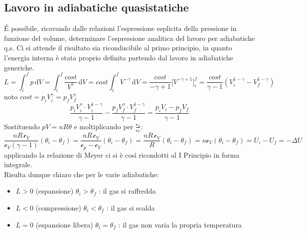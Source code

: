 \documentclass[10pt, oneside]{book}
\newcommand{\ds}{\displaystyle}
\newcommand{\integral}[4]{\int_{#1}^{#2} #3 \, \mathrm{d}#4}
\newcommand{\molhtv}{\mathcal{c}_V }
\newcommand{\molhtp}{\mathcal{c}_p }
\begin{document}
\subsection{Lavoro in adiabatiche quasistatiche}
\'E possibile, ricavando dalle relazioni l'espressione esplicita della pressione in funzione del volume, determinare l'espressione analitica del lavoro per adiabatiche q.s. Ci si attende il risultato sia riconducibile al primo principio, in quanto l'energia interna è stata proprio definita partendo dal lavoro in adiabatiche generiche.
\[L = \integral{i}{f}{p}{V} = \integral{i}{f}{\frac{cost}{V^\gamma}}{V} = cost \integral{i}{f}{V^{-\gamma}}{V} = \frac{cost}{- \gamma + 1} \big[V^{-\gamma + 1}\big]_i^f = \frac{cost}{\gamma - 1}(V_i^{1-\gamma} - V_f^{1-\gamma})\]
noto $\ds cost = p_iV_i^\gamma = p_f V_f^\gamma$
\[\frac{p_i V_i^\gamma \cdot V_i^{1-\gamma}}{\gamma - 1} - \frac{p_f V_f^\gamma \cdot V_f^{1-\gamma}}{\gamma - 1} = \boxed{\frac{p_iV_i - p_f V_f}{\gamma -1}}\]
Sostituendo $pV = nR\theta$ e moltiplicando per $\ds \frac{\molhtv}{\molhtv}$:
\[\frac{nR \, \molhtv}{\molhtv(\gamma -1)} (\theta_i - \theta_f) = \frac{nR \,  \molhtv}{\molhtp - \molhtv}(\theta_i - \theta_f) = \frac{nR \,  \molhtv}{R}(\theta_i - \theta_f) = n \molhtv (\theta_i - \theta_f) = U_i - U_f = - \Delta U\]
applicando la relazione di Meyer ci si è così ricondotti al I Principio in forma integrale.\\
Risulta dunque chiaro che per le varie adiabatiche:
\begin{itemize}
\item $L > 0$ (espansione) $\theta_i > \theta_f$ : il gas si raffredda
\item $L < 0$ (compressione) $\theta_i < \theta_f$ : il gas si scalda
\item $L = 0$ (espansione libera) $\theta_i = \theta_f$ : il gas non varia la propria temperatura
\end{itemize}
\end{document}
